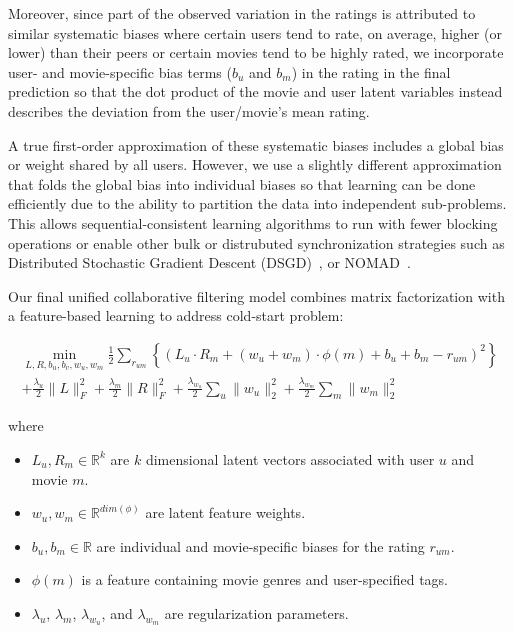 \documentclass{article} %
\begin{document}
	Moreover, since part of the observed variation in the ratings is attributed
	to similar systematic biases \cite{koren:matrix} where certain users tend to
	rate, on average, higher (or lower) than their peers or certain movies tend
	to be highly rated, we incorporate user- and movie-specific bias terms
	($b_u$ and $b_m$) in the rating in the final prediction so that the dot
	product of the movie and user latent variables instead describes the
	deviation from the user/movie's mean rating.

	A true first-order approximation of these systematic biases includes a
	global bias or weight shared by all users. However, we use a slightly
	different approximation that folds the global bias into individual biases so
	that learning can be done efficiently due to the ability to  partition the
	data into independent sub-problems. This allows sequential-consistent
	learning algorithms to run with fewer blocking operations or enable other
	bulk or distrubuted synchronization strategies such as Distributed
	Stochastic Gradient Descent (DSGD)~\cite{gemulla2011large}, or
	NOMAD~\cite{yun2013nomad}.

	Our final unified collaborative filtering model combines matrix
	factorization with a feature-based learning to address cold-start problem:

	\begin{multline}
	\min_{L, R, b_u, b_v, w_u, w_m} \frac{1}{2}\sum_{r_{um}} \left\{(L_u \cdot R_m + (w_u + w_m) \cdot \phi(m) + b_u + b_m - r_{um})^2\right\}\\ + \frac{\lambda_u}{2}\|L\|^2_F + \frac{\lambda_m}{2}\|R\|^2_F + \frac{\lambda_{w_u}}{2}\sum_u\|w_u\|^2_2 + \frac{\lambda_{w_m}}{2}\sum_m\|w_m\|^2_2\label{eq:main}
	\end{multline}

	where
	\begin{itemize}
		\item $L_u, R_m \in \mathbb{R}^k$ are $k$ dimensional latent vectors associated with user $u$ and movie $m$.
		\item $w_u,w_m \in \mathbb{R}^{dim(\phi)}$ are latent feature weights.
		\item $b_u, b_m \in \mathbb{R}$ are individual and movie-specific biases for the rating $r_{um}$.
		\item $\phi(m)$ is a feature containing movie genres and user-specified tags.
		\item $\lambda_u$, $\lambda_m$, $\lambda_{w_u}$, and $\lambda_{w_m}$ are regularization parameters.
	\end{itemize}
\end{document}

